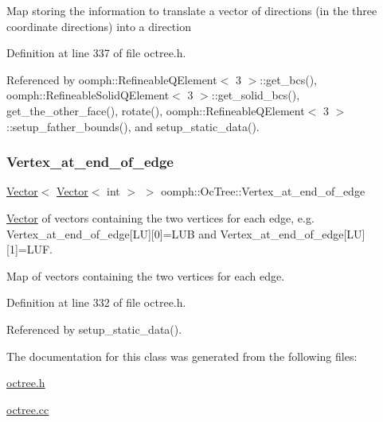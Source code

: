 Map storing the information to translate a vector of directions (in the three coordinate directions) into a direction 

Definition at line 337 of file octree.\+h.



Referenced by oomph\+::\+Refineable\+Q\+Element$<$ 3 $>$\+::get\+\_\+bcs(), oomph\+::\+Refineable\+Solid\+Q\+Element$<$ 3 $>$\+::get\+\_\+solid\+\_\+bcs(), get\+\_\+the\+\_\+other\+\_\+face(), rotate(), oomph\+::\+Refineable\+Q\+Element$<$ 3 $>$\+::setup\+\_\+father\+\_\+bounds(), and setup\+\_\+static\+\_\+data().

\mbox{\label{classoomph_1_1OcTree_acf182a71db90c350c3f1d334d73d103f}} 
\subsubsection{\texorpdfstring{Vertex\+\_\+at\+\_\+end\+\_\+of\+\_\+edge}{Vertex\_at\_end\_of\_edge}}
{\footnotesize\ttfamily \hyperlink{classoomph_1_1Vector}{Vector}$<$ \hyperlink{classoomph_1_1Vector}{Vector}$<$ int $>$ $>$ oomph\+::\+Oc\+Tree\+::\+Vertex\+\_\+at\+\_\+end\+\_\+of\+\_\+edge\hspace{0.3cm}{\ttfamily [static]}}



{\ttfamily \hyperlink{classoomph_1_1Vector}{Vector}} of vectors containing the two vertices for each edge, e.\+g. {\ttfamily Vertex\+\_\+at\+\_\+end\+\_\+of\+\_\+edge}\mbox{[}LU\mbox{]}\mbox{[}0\mbox{]}=L\+UB and {\ttfamily Vertex\+\_\+at\+\_\+end\+\_\+of\+\_\+edge}\mbox{[}LU\mbox{]}\mbox{[}1\mbox{]}=L\+UF. 

Map of vectors containing the two vertices for each edge. 

Definition at line 332 of file octree.\+h.



Referenced by setup\+\_\+static\+\_\+data().



The documentation for this class was generated from the following files\+:\begin{DoxyCompactItemize}
\item 
\hyperlink{octree_8h}{octree.\+h}\item 
\hyperlink{octree_8cc}{octree.\+cc}\end{DoxyCompactItemize}
